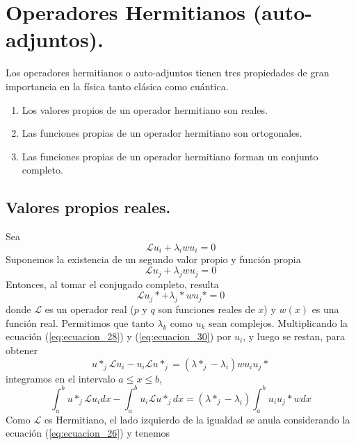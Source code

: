 \section{Operadores Hermitianos (auto-adjuntos).}
Los operadores hermitianos o auto-adjuntos tienen tres propiedades de gran importancia en la física tanto clásica como cuántica.
\begin{enumerate}
\item Los valores propios de un operador hermitiano son reales.
\item Las funciones propias de un operador hermitiano son ortogonales.
\item Las funciones propias de un operador hermitiano forman un conjunto completo.
\end{enumerate}
\subsection{Valores propios reales.}
Sea
\begin{equation}
\mathscr{L} u_{i} + \lambda_{i} w u_{i} = 0
\label{eq:ecuacion_28}
\end{equation}
Suponemos la existencia de un segundo valor propio y función propia
\begin{equation}
\mathscr{L} u_{j} + \lambda_{j} w u_{j} = 0
\label{eq:ecuacion_29}
\end{equation}
Entonces, al tomar el conjugado completo, resulta
\begin{equation}
\mathscr{L} u_{j}* + \lambda_{j}* w u_{j}* = 0
\label{eq:ecuacion_30}
\end{equation}
donde $\mathscr{L}$ es un operador real ($p$ y $q$ son funciones reales de $x$) y $w(x)$ es una función real. Permitimos que tanto $\lambda_{k}$ como $u_{k}$ sean complejos. Multiplicando la ecuación (\ref{eq:ecuacion_28}) y (\ref{eq:ecuacion_30}) por $u_{i}$, y luego se restan, para obtener
\begin{equation}
u*_{j} \mathscr{L} u_{i} - u_{i} \mathscr{L} u*_{j} =  (\lambda*_{j} - \lambda_{i}) w u_{i} u_{j}*
\label{eq:ecuacion_31}
\end{equation}
integramos en el intervalo $a \leq x \leq b$,
\begin{equation}
\int_{a}^{b} u*_{j} \mathscr{L} u_{i} dx - \int_{a}^{b} u_{i} \mathscr{L} u*_{j} dx = (\lambda*_{j} - \lambda_{i}) \int_{a}^{b}  u_{i} u_{j}* w dx
\label{eq:ecuacion_32}
\end{equation}
Como $\mathscr{L}$ es Hermitiano, el lado izquierdo de la igualdad se anula considerando la ecuación (\ref{eq:ecuacion_26}) y tenemos
